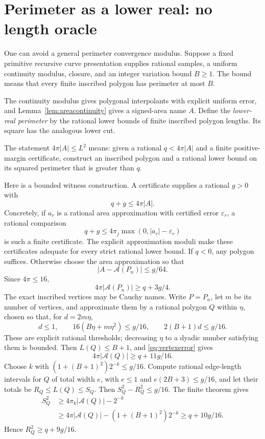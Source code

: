 \documentclass[11pt,a4paper]{article}
\theoremstyle{definition}
\newcommand{\eps}{\varepsilon}
\newcommand{\Area}{\mathcal A}
\begin{document}
\section{Perimeter as a lower real: no length oracle}\label{sec:lower}
One can avoid a general perimeter convergence modulus. Suppose a
fixed primitive recursive curve presentation supplies rational samples,
a uniform continuity modulus, closure, and an integer variation bound
\(B\ge1\). The bound means that every finite inscribed polygon has
perimeter at most \(B\).

The continuity modulus gives polygonal interpolants with explicit
uniform error, and Lemma~\ref{lem:areacontinuity} gives a signed-area
name \(A\). Define the \emph{lower-real perimeter} by the rational
lower bounds of finite inscribed polygon lengths. Its square has the
analogous lower cut.

The statement \(4\pi|A|\le L^2\) means:
given a rational \(q<4\pi|A|\) and a finite positive-margin certificate,
construct an inscribed polygon and a rational lower bound on its
squared perimeter that is greater than \(q\).

Here is a bounded witness construction. A certificate supplies a
rational \(g>0\) with
\[
 q+g\le4\pi|A|.
 \tag{9.1}\label{eq:gapcert}
\]
Concretely, if \(a_r\) is a rational area approximation with certified
error \(\eps_r\), a rational comparison
\[
 q+g\le4\pi_j\max(0,|a_r|-\eps_r)
\]
is such a finite certificate. The explicit approximation moduli make
these certificates adequate for every strict rational lower bound.
If \(q<0\), any polygon suffices. Otherwise choose the area
approximation so that
\[
 |A-\Area(P_n)|\le g/64.
\]
Since \(4\pi\le16\),
\[
 4\pi|\Area(P_n)|\ge q+3g/4.
 \tag{9.2}\label{eq:marginremain}
\]
The exact inscribed vertices may be Cauchy names. Write \(P=P_n\),
let \(m\) be its number of vertices, and approximate them by a rational
polygon \(Q\) within \(\eta\), chosen so that, for \(d=2m\eta\),
\[
 d\le1,\qquad
 16(B\eta+m\eta^2)\le g/16,\qquad
 2(B+1)d\le g/16.
 \tag{9.3}\label{eq:lengthinterval}
\]
These are explicit rational thresholds; decreasing \(\eta\) to a
dyadic number satisfying them is bounded. Then
\(L(Q)\le B+1\), and \eqref{eq:vertexerror} gives
\[
 4\pi|\Area(Q)|\ge q+11g/16.
\]
Choose \(k\) with
\((1+(B+1)^2)2^{-k}\le g/16\).
Compute rational edge-length intervals for \(Q\) of total width \(e\),
with \(e\le1\) and \(e(2B+3)\le g/16\), and let their totals be
\(R_Q\le L(Q)\le S_Q\). Then
\(S_Q^2-R_Q^2\le g/16\). The finite theorem gives
\[
 \begin{aligned}
 S_Q^2
 &\ge4\pi_k|\Area(Q)|-2^{-k}\\
 &\ge4\pi|\Area(Q)|-(1+(B+1)^2)2^{-k}
 \ge q+10g/16.
 \end{aligned}
\]
Hence \(R_Q^2\ge q+9g/16\).
\end{document}
